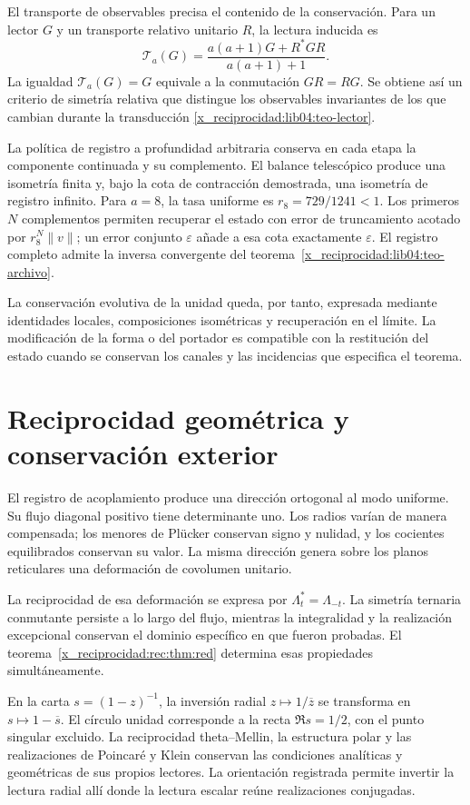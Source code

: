 El transporte de observables precisa el contenido de la
conservación. Para un lector \(G\) y un transporte relativo
unitario \(R\), la lectura inducida es
\[
 \mathcal T_a(G)=
 \frac{a(a+1)G+R^*GR}{a(a+1)+1}.
\]
La igualdad \(\mathcal T_a(G)=G\) equivale a la conmutación
\(GR=RG\). Se obtiene así un criterio de simetría relativa
que distingue los observables invariantes de los que cambian
durante la transducción
\ref{x_reciprocidad:lib04:teo-lector}.

La política de registro a profundidad arbitraria conserva
en cada etapa la componente continuada y su complemento.
El balance telescópico produce una isometría finita y,
bajo la cota de contracción demostrada, una isometría de
registro infinito. Para \(a=8\), la tasa uniforme es
\(r_8=729/1241<1\). Los primeros \(N\) complementos
permiten recuperar el estado con error de truncamiento
acotado por \(r_8^N\|v\|\); un error conjunto
\(\varepsilon\) añade a esa cota exactamente
\(\varepsilon\). El registro completo admite la
inversa convergente del
teorema~\ref{x_reciprocidad:lib04:teo-archivo}.

La conservación evolutiva de la unidad queda, por tanto,
expresada mediante identidades locales, composiciones
isométricas y recuperación en el límite. La modificación
de la forma o del portador es compatible con la restitución
del estado cuando se conservan los canales y las incidencias
que especifica el teorema.

\section{Reciprocidad geométrica y conservación exterior}

El registro de acoplamiento produce una dirección ortogonal
al modo uniforme. Su flujo diagonal positivo tiene
determinante uno. Los radios varían de manera compensada;
los menores de Plücker conservan signo y nulidad, y los
cocientes equilibrados conservan su valor. La misma
dirección genera sobre los planos reticulares una
deformación de covolumen unitario.

La reciprocidad de esa deformación se expresa por
\(\Lambda_t^*=\Lambda_{-t}\). La simetría ternaria
conmutante persiste a lo largo del flujo, mientras la
integralidad y la realización excepcional conservan el
dominio específico en que fueron probadas. El
teorema~\ref{x_reciprocidad:rec:thm:red} determina
esas propiedades simultáneamente.

En la carta \(s=(1-z)^{-1}\), la inversión radial
\(z\mapsto1/\overline z\) se transforma en
\(s\mapsto1-\overline s\). El círculo unidad corresponde
a la recta \(\Re s=1/2\), con el punto singular excluido.
La reciprocidad theta--Mellin, la estructura polar y
las realizaciones de Poincaré y Klein conservan las
condiciones analíticas y geométricas de sus propios
lectores. La orientación registrada permite invertir
la lectura radial allí donde la lectura escalar reúne
realizaciones conjugadas.

